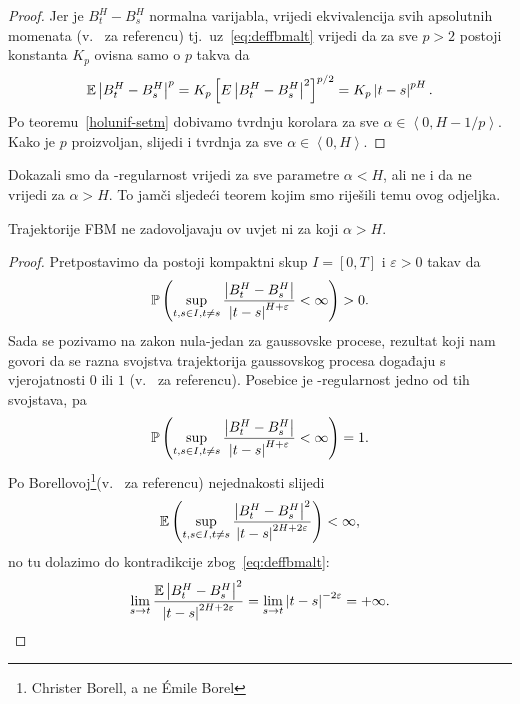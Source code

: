 \documentclass[main.tex]{subfiles}
\begin{document}
\begin{proof}
	Jer je \( B^H_t-B^H_s \) normalna varijabla, vrijedi ekvivalencija svih
	apsolutnih momenata (v.~\cite[str.~16]{ayache} za referencu) tj.\
	uz~\eqref{eq:deffbmalt} vrijedi da
	za sve \( p > 2 \) postoji konstanta \( K_p \) ovisna samo o \( p \) takva da
	\begin{equation}
		\mathbb{E} \left| {B^H_t-B^H_s} \right|^p = K_p \left[ E \left| {B^H_t-B^H_s} \right|^2 \right] ^{p/2} = K_p \left| {t-s} \right|^{pH}.
	\end{equation}
	Po teoremu~\ref{holunif-setm} dobivamo tvrdnju korolara
	za sve \( \alpha \in \left\langle 0,H-1/p  \right\rangle  \). Kako je \( p \)
	proizvoljan, slijedi i tvrdnja za sve \( \alpha \in \left\langle 0,H \right\rangle \).
\end{proof}

Dokazali smo da \holder -regularnost vrijedi za sve parametre \( \alpha < H \),
ali ne i da ne vrijedi za \( \alpha > H \). To jamči sljedeći teorem
kojim smo riješili temu ovog odjeljka.

\begin{teorem}\label{holunif-prop>}
	Trajektorije FBM ne zadovoljavaju \holder ov uvjet ni za koji \( \alpha > H \).
\end{teorem}

\begin{proof}
	Pretpostavimo da postoji kompaktni skup \( I =[0,T] \)
	i \( \varepsilon > 0 \) takav da
	\begin{equation}
		\mathbb{P}\left( \sup\limits_{t,s \in I, t\neq s} \frac{\left| {B^H_t-B^H_s} \right|}{\left| {t-s} \right|^{H+\varepsilon}} < \infty \right) > 0.
	\end{equation}
	Sada se pozivamo na zakon nula-jedan za gaussovske procese, rezultat koji nam govori da se razna svojstva
	trajektorija gaussovskog procesa događaju s vjerojatnosti \( 0 \) ili \( 1 \) (v.~\cite[prop.~3.7]{ayache} za referencu).
	Posebice je \holder -regularnost jedno od tih svojstava, pa
	\begin{equation}
		\mathbb{P} \left( \sup\limits_{t,s \in I, t\neq s} \frac{\left| {B^H_t-B^H_s} \right|}{\left| {t-s} \right|^{H+\varepsilon}} < \infty  \right) = 1.
	\end{equation}
	Po Borellovoj\footnote{Christer Borell, a ne \'Emile Borel}(v.~\cite[prop.~3.7]{ayache} za referencu) nejednakosti slijedi
	\begin{equation}
		\mathbb{E} \left( \sup_{t,s \in I, t\neq s} \frac{\left| {B^H_t-B^H_s} \right|^2}{\left| {t-s} \right|^{2H+2\varepsilon}} \right) < \infty,
	\end{equation}
	no tu dolazimo do kontradikcije zbog~\eqref{eq:deffbmalt}:
	\begin{equation}
		\lim_{s \rightarrow t} \frac{\mathbb{E} \left| {B^H_t-B^H_s} \right|^2}{\left| {t-s} \right|^{2H+2\varepsilon}} = \lim_{s \rightarrow t} \left| {t-s} \right|^{-2\varepsilon} = +\infty.
	\end{equation}
\end{proof}
\end{document}
